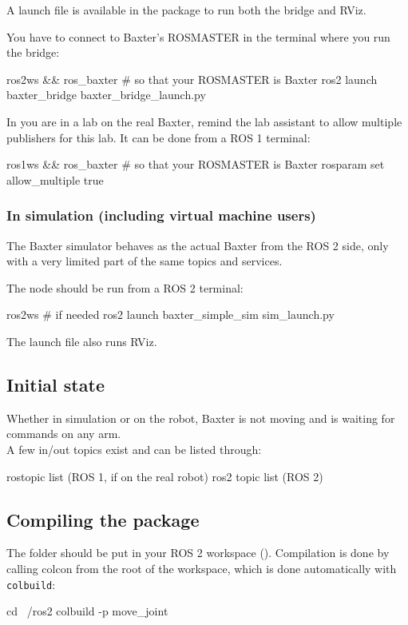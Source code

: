 \documentclass{ecnreport}
\begin{document}
A launch file is available in the  package to run both the bridge and RViz.

You have to connect to Baxter's ROSMASTER in the terminal where you run the bridge:
\begin{bashcodelarge}
 ros2ws && ros_baxter # so that your ROSMASTER is Baxter
 ros2 launch baxter_bridge baxter_bridge_launch.py
\end{bashcodelarge}

In you are in a lab on the real Baxter, remind the lab assistant to allow multiple publishers for this lab.
It can be done from a ROS 1 terminal:
\begin{bashcodelarge}
 ros1ws && ros_baxter # so that your ROSMASTER is Baxter
 rosparam set allow_multiple true
\end{bashcodelarge}

\subsubsection{In simulation (including virtual machine users)}

The Baxter simulator behaves as the actual Baxter from the ROS 2 side, only with a very limited part of the same topics and services. 

The  node should be run from a ROS 2 terminal:
\begin{bashcodelarge}
ros2ws  # if needed
ros2 launch baxter_simple_sim sim_launch.py
\end{bashcodelarge}
The launch file also runs RViz.

\subsection{Initial state}

Whether in simulation or on the robot, Baxter is not moving and is waiting for commands on any arm.\\
A few in/out topics exist and can be listed through:
\begin{bashcodelarge}
rostopic list (ROS 1, if on the real robot)
ros2 topic list (ROS 2)
\end{bashcodelarge}

\subsection{Compiling the package}

The folder should be put in your ROS 2 workspace (). Compilation is done by calling colcon from the root of the workspace, which is done automatically with \texttt{colbuild}:
\begin{bashcodelarge}
 cd ~/ros2
 colbuild -p move_joint
\end{bashcodelarge}
\end{document}
